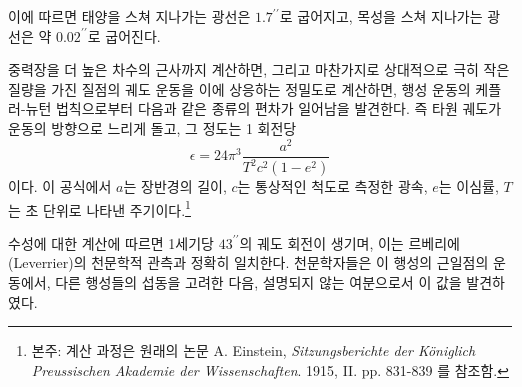 \documentclass[b5paper]{article}
\begin{document}
이에 따르면 태양을 스쳐 지나가는 광선은 $1.7^{\prime\prime}$로 굽어지고, 목성을 스쳐 지나가는 광선은 약 $0.02^{\prime\prime}$로 굽어진다.

중력장을 더 높은 차수의 근사까지 계산하면, 그리고 마찬가지로 상대적으로 극히 작은 질량을 가진 질점의 궤도 운동을 이에 상응하는 정밀도로 계산하면, 행성 운동의 케플러-뉴턴 법칙으로부터 다음과 같은 종류의 편차가 일어남을 발견한다. 즉 타원 궤도가 운동의 방향으로 느리게 돌고, 그 정도는 1 회전당
\begin{equation} \label{eq-75}
	\epsilon=24\pi^3\frac{a^2}{T^2 c^2 \left(1-e^2\right)}
\end{equation}
이다.
이 공식에서 $a$는 장반경의 길이, $c$는 통상적인 척도로 측정한 광속, $e$는 이심률, $T$는 초 단위로 나타낸 주기이다.\footnote{본주: 계산 과정은 원래의 논문 A. Einstein, \emph{Sitzungsberichte der K\"oniglich Preussischen Akademie der Wissenschaften}. 1915, II. pp. 831-839 를 참조함.}

수성에 대한 계산에 따르면 1세기당 $43^{\prime\prime}$의 궤도 회전이 생기며, 이는 르베리에(Leverrier)의 천문학적 관측과 정확히 일치한다. 천문학자들은 이 행성의 근일점의 운동에서, 다른 행성들의 섭동을 고려한 다음, 설명되지 않는 여분으로서 이 값을 발견하였다.  
\end{document}
